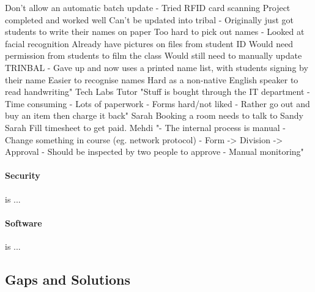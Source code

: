       Don’t allow an automatic batch update
  - Tried RFID card scanning
      Project completed and worked well
        Can’t be updated into tribal
  - Originally just got students to write their names on paper
      Too hard to pick out names
  - Looked at facial recognition
      Already have pictures on files from student ID
      Would need permission from students to film the class
      Would still need to manually update TRINBAL
  - Gave up and now uses a printed name list, with students signing by their name
      Easier to recognise names
      Hard as a non-native English speaker to read handwriting"
Tech Labs Tutor	"Stuff is bought through the IT department
- Time consuming
- Lots of paperwork
- Forms hard/not liked
- Rather go out and buy an item then charge it back"
Sarah	Booking a room needs to talk to Sandy 
Sarah	Fill timesheet to get paid.
Mehdi	"-	The internal process is manual
-	Change something in course (eg. network protocol)
-	Form -> Division -> Approval
-	Should be inspected by two people to approve
-	Manual monitoring"

\paragraph{Security} is ...


\paragraph{Software} is ...

\subsection{Gaps and Solutions}



